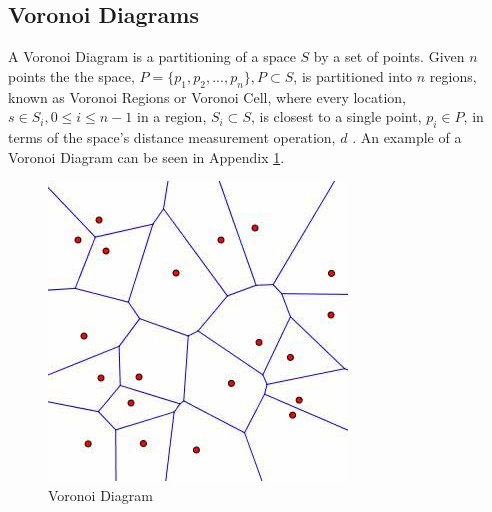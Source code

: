 \subsection{Voronoi Diagrams}\label{tess}
A Voronoi Diagram is a partitioning of a space $S$ by a set of points. Given $n$ points the the space, $P = \{p_1,p_2,...,p_n\}, P \subset S$, is partitioned into $n$ regions, known as Voronoi Regions or Voronoi Cell, where every location, $s \in S_i,0 \leq i \leq n-1$ in a region, $S_i \subset S$, is closest to a single point, $p_i \in P$, in terms of the space's distance measurement operation, $d$ \cite{okabe2009spatial}. An example of a Voronoi Diagram can be seen in Appendix \ref{voronoipic}.
\begin{figure}[H]
	\centering
   	\includegraphics[scale=0.65]{Images/voronoi.jpg}
    \caption{Voronoi Diagram\cite{voronoipic}}
     \label{voronoipic}
\end{figure}
